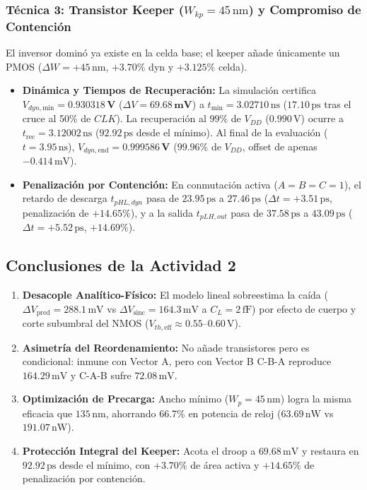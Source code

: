 \subsubsection{Técnica 3: Transistor Keeper (\texorpdfstring{$W_{kp} = 45\,\text{nm}$}{Wkp = 45 nm}) y Compromiso de Contención}
El inversor dominó ya existe en la celda base; el keeper añade únicamente un PMOS ($\Delta W = +45\,\text{nm}$, $+3.70\%$ dyn y $+3.125\%$ celda).
\begin{itemize}[leftmargin=1.4em,itemsep=0.03em]
  \item \textbf{Dinámica y Tiempos de Recuperación:} La simulación certifica $V_{dyn,\text{min}} = \mathbf{0.930318\,\text{V}}$ ($\Delta V = \mathbf{69.68\,\text{mV}}$) a $t_{\text{min}} = 3.02710\,\text{ns}$ ($17.10\,\text{ps}$ tras el cruce al 50\% de $CLK$). La recuperación al $99\%$ de $V_{DD}$ ($0.990\,\text{V}$) ocurre a $t_{\text{rec}} = 3.12002\,\text{ns}$ ($92.92\,\text{ps}$ desde el mínimo). Al final de la evaluación ($t=3.95\,\text{ns}$), $V_{dyn,\text{end}} = \mathbf{0.999586\,\text{V}}$ ($99.96\%$ de $V_{DD}$, offset de apenas $-0.414\,\text{mV}$).
  \item \textbf{Penalización por Contención:} En conmutación activa ($A=B=C=1$), el retardo de descarga $t_{pHL,dyn}$ pasa de $23.95\,\text{ps}$ a $27.46\,\text{ps}$ ($\Delta t = +3.51\,\text{ps}$, penalización de $\mathbf{+14.65\%}$), y a la salida $t_{pLH,out}$ pasa de $37.58\,\text{ps}$ a $43.09\,\text{ps}$ ($\Delta t = +5.52\,\text{ps}$, $\mathbf{+14.69\%}$).
\end{itemize}

\subsection{Conclusiones de la Actividad 2}
\begin{enumerate}[leftmargin=1.4em,itemsep=0.03em]
  \item \textbf{Desacople Analítico-Físico:} El modelo lineal sobreestima la caída ($\Delta V_{\text{pred}} = 288.1\,\text{mV}$ vs $\Delta V_{\text{sinc}} = 164.3\,\text{mV}$ a $C_L=2\,\text{fF}$) por efecto de cuerpo y corte subumbral del NMOS ($V_{th,\text{eff}} \approx 0.55\text{--}0.60\,\text{V}$).
  \item \textbf{Asimetría del Reordenamiento:} No añade transistores pero es condicional: inmune con Vector A, pero con Vector B C-B-A reproduce $164.29\,\text{mV}$ y C-A-B sufre $72.08\,\text{mV}$.
  \item \textbf{Optimización de Precarga:} Ancho mínimo ($W_p=45\,\text{nm}$) logra la misma eficacia que $135\,\text{nm}$, ahorrando 66.7\% en potencia de reloj ($63.69\,\text{nW}$ vs $191.07\,\text{nW}$).
  \item \textbf{Protección Integral del Keeper:} Acota el droop a $69.68\,\text{mV}$ y restaura en $92.92\,\text{ps}$ desde el mínimo, con $+3.70\%$ de área activa y $+14.65\%$ de penalización por contención.
\end{enumerate}
